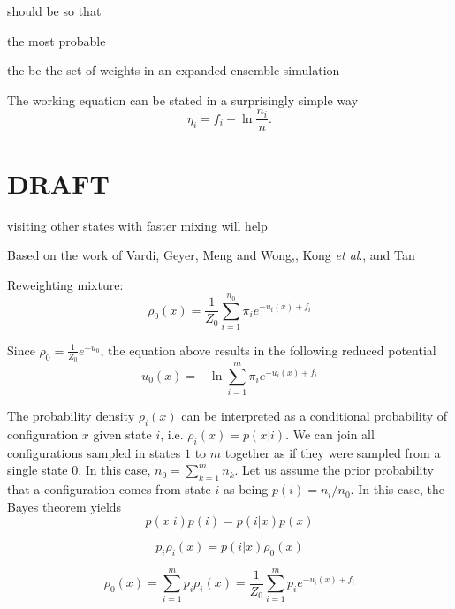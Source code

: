 \documentclass[aip,jcp,reprint,amsmath,amssymb]{revtex4-1}
\begin{document}
should be so that 

the most probable 

the be the set of weights in an expanded ensemble simulation 

 The working equation can be stated in a surprisingly simple way
\begin{equation}
\eta_i = f_i - \ln \frac{n_i}{n}.
\end{equation}



\section{DRAFT}

visiting other states with faster mixing will help 

Based on the work of Vardi,\cite{Vardi_1985} Geyer,\cite{Geyer_1994} Meng and Wong,\cite{Meng_1996}, Kong \textit{et al}.\cite{Kong_2003}, and Tan\cite{Tan_2004}

Reweighting mixture\cite{Geyer_1994}:
\begin{equation*}
\rho_0(x) = \frac{1}{Z_0} \sum_{i=1}^{n_0} \pi_i e^{-u_i(x) + f_i}
\end{equation*}

Since $\rho_0 = \frac{1}{Z_0} e^{-u_0}$, the equation above results in the following reduced potential
\begin{equation}
\label{eq:mbar_reduced_potential}
u_0(x) = -\ln \sum_{i=1}^m \pi_i e^{-u_i(x) + f_i}
\end{equation}





The probability density $\rho_i(x)$ can be interpreted as a conditional probability of configuration $x$ given state $i$, i.e. $\rho_i(x) = p(x|i)$. We can join all configurations sampled in states $1$ to $m$ together as if they were sampled from a single state $0$. In this case, $n_0 = \sum_{k=1}^m n_k$. Let us assume the prior probability that a configuration comes from state $i$ as being $p(i) = n_i/n_0$. In this case, the Bayes theorem yields
\begin{equation*}
p(x|i) p(i) = p(i|x) p(x)
\end{equation*}

\begin{equation*}
p_i \rho_i(x) = p(i|x) \rho_0(x)
\end{equation*}

\begin{equation}
\label{eq:mbar_probability_density}
\rho_0(x) = \sum_{i=1}^m p_i \rho_i(x) = \frac{1}{Z_0} \sum_{i=1}^m p_i e^{-u_i(x) + f_i}
\end{equation}
\end{document}
